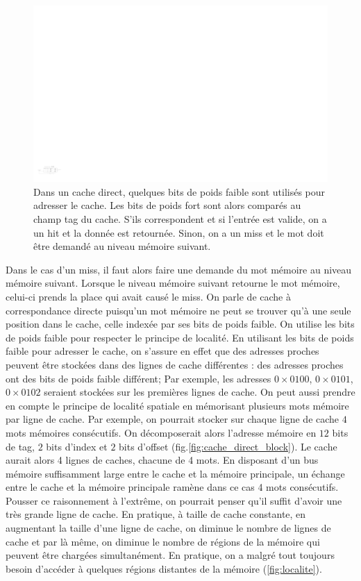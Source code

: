 \begin{figure}[htbp]
\includegraphics[width=\linewidth]{Figs/direct_cache.pdf}
\caption{\label{fig:cache_direct} Dans un cache direct, quelques bits de poids faible sont utilisés pour adresser le cache. Les bits de poids fort sont alors comparés au champ tag du cache. S'ils correspondent et si l'entrée est valide, on a un hit et la donnée est retournée. Sinon, on a un miss et le mot doit être demandé au niveau mémoire suivant.}
\end{figure}

Dans le cas d'un miss, il faut alors faire une demande du mot mémoire au niveau mémoire suivant. Lorsque le niveau mémoire suivant retourne le mot mémoire, celui-ci prends la place qui avait causé le miss. On parle de cache à correspondance directe puisqu'un mot mémoire ne peut se trouver qu'à une seule position dans le cache, celle indexée par ses bits de poids faible. On utilise les bits de poids faible pour respecter le principe de localité. En utilisant les bits de poids faible pour adresser le cache, on s'assure en effet que des adresses proches peuvent être stockées dans des lignes de cache différentes : des adresses proches ont des bits de poids faible différent; Par exemple, les adresses $0\times0100$, $0\times0101$, $0\times0102$ seraient stockées sur les premières lignes de cache. On peut aussi prendre en compte le principe de localité spatiale en mémorisant plusieurs mots mémoire par ligne de cache. Par exemple, on pourrait stocker sur chaque ligne de cache $4$ mots mémoires consécutifs. On décomposerait alors l'adresse mémoire en $12$ bits de tag, $2$ bits d'index et $2$ bits d'offset (fig.\ref{fig:cache_direct_block}). Le cache aurait alors 4 lignes de caches, chacune de 4 mots. En disposant d'un bus mémoire suffisamment large entre le cache et la mémoire principale, un échange entre le cache et la mémoire principale ramène dans ce cas 4 mots consécutifs. Pousser ce raisonnement à l'extrême, on pourrait penser qu'il suffit d'avoir une très grande ligne de cache. En pratique, à taille de cache constante, en augmentant la taille d'une ligne de cache, on diminue le nombre de lignes de cache et par là même, on diminue le nombre de régions de la mémoire qui peuvent être chargées simultanément. En pratique, on a malgré tout toujours besoin d'accéder à quelques régions distantes de la mémoire (\ref{fig:localite}).


